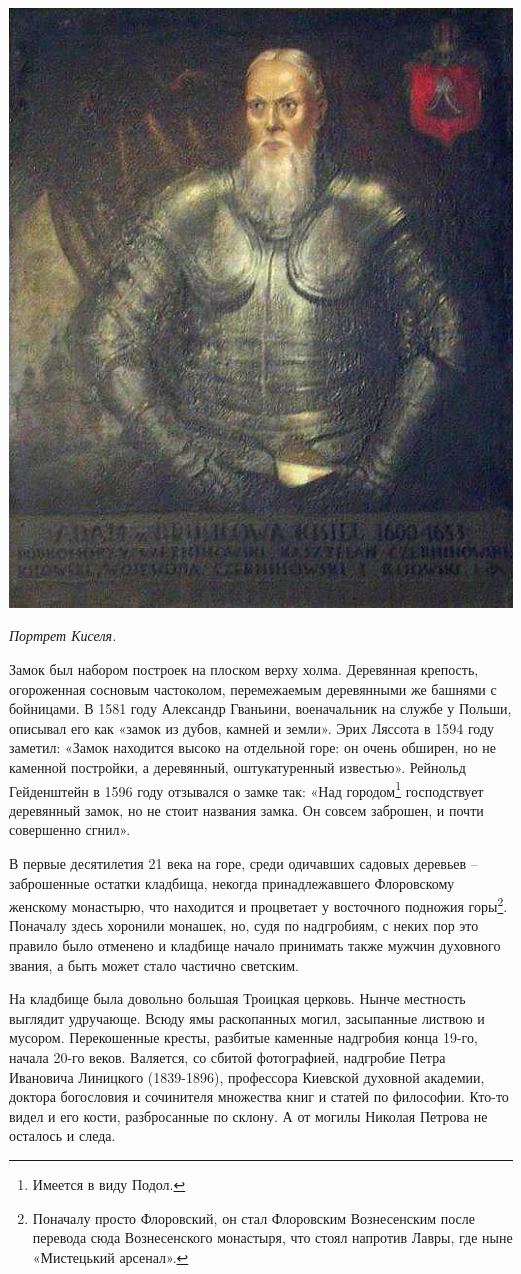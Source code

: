 \begin{center}
\includegraphics[width=0.40\linewidth]{chast-colebanie-osnov/gora-zamkovaya-valovaya/adam_kisiel.jpg}

\textit{Портрет Киселя.}
\end{center}

Замок был набором построек на плоском верху холма. Деревянная крепость, огороженная сосновым частоколом, перемежаемым деревянными же башнями с бойницами. В 1581 году Александр Гваньини, военачальник на службе у Польши, описывал его как «замок из дубов, камней и земли». Эрих Ляссота в 1594 году заметил: «Замок находится высоко на отдельной горе: он очень обширен, но не каменной постройки, а деревянный, оштукатуренный известью». Рейнольд Гейденштейн в 1596 году отзывался о замке так: «Над городом\footnote{Имеется в виду Подол.} господствует деревянный замок, но не стоит названия замка. Он совсем заброшен, и почти совершенно сгнил».

В первые десятилетия 21 века на горе, среди одичавших садовых деревьев – заброшенные остатки кладбища, некогда принадлежавшего Флоровскому женскому монастырю, что находится и процветает у восточного подножия горы\footnote{Поначалу просто Флоровский, он стал Флоровским Вознесенским после перевода сюда Вознесенского монастыря, что стоял напротив Лавры, где ныне «Мистецький арсенал».}. Поначалу здесь хоронили монашек, но, судя по надгробиям, с неких пор это правило было отменено и кладбище начало принимать также мужчин духовного звания, а быть может стало частично светским.

На кладбище была довольно большая Троицкая церковь. Нынче местность выглядит удручающе. Всюду ямы раскопанных могил, засыпанные листвою и мусором. Перекошенные кресты, разбитые каменные надгробия конца 19-го, начала 20-го веков. Валяется, со сбитой фотографией, надгробие Петра Ивановича Линицкого (1839-1896), профессора Киевской духовной академии, доктора богословия и сочинителя множества книг и статей по философии. Кто-то видел и его кости, разбросанные по склону. А от могилы Николая Петрова не осталось и следа.

